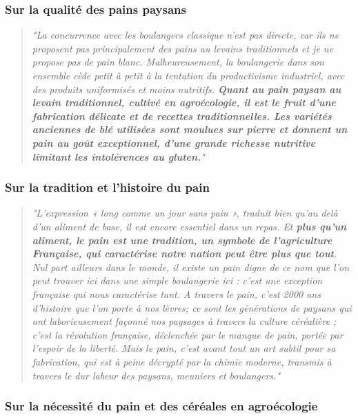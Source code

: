 \documentclass{book}
\begin{document}
\subsubsection{Sur la qualité des pains paysans}

\begin{quote}

\textit{"La concurrence avec les boulangers classique n’est pas directe, car ils ne proposent pas principalement des pains au levains traditionnels et je ne propose pas de pain blanc. Malheureusement, la boulangerie dans son ensemble cède petit à petit à la tentation du productivisme industriel, avec des produits uniformisés et moins nutritifs. \textbf{Quant au pain paysan au levain traditionnel, cultivé en agroécologie, il est le fruit d'une fabrication délicate et de recettes traditionnelles. Les variétés anciennes de blé utilisées sont moulues sur pierre et donnent un pain au goût exceptionnel, d'une grande richesse nutritive limitant les intolérences au gluten.}"}

\end{quote}

\subsubsection{Sur la tradition et l'histoire du pain}

\begin{quote}
\textit{"L'expression « long comme un jour sans pain », traduit bien qu'au delà d'un aliment de base, il est encore essentiel dans un repas. Et \textbf{plus qu’un aliment, le pain est une tradition, un symbole de l’agriculture Française, qui caractérise notre nation peut être plus que tout}. Nul part ailleurs dans le monde, il existe un pain digne de ce nom que l’on peut trouver ici dans une simple boulangerie ici : c’est une exception française qui nous caractérise tant. A travers le pain, c’est 2000 ans d’histoire que l’on porte à nos lèvres; ce sont les générations de paysans qui ont laborieusement façonné nos paysages à travers la culture céréalière ; c’est la révolution française, déclenchée par le manque de pain, portée par l’espoir de la liberté. Mais le pain, c'est avant tout un art subtil pour sa fabrication, qui est à peine décrypté par la chimie moderne, transmis à travers le dur labeur des paysans, meuniers et boulangers."}
\end{quote}


\subsubsection{Sur la nécessité du pain et des céréales en agroécologie}
\end{document}

